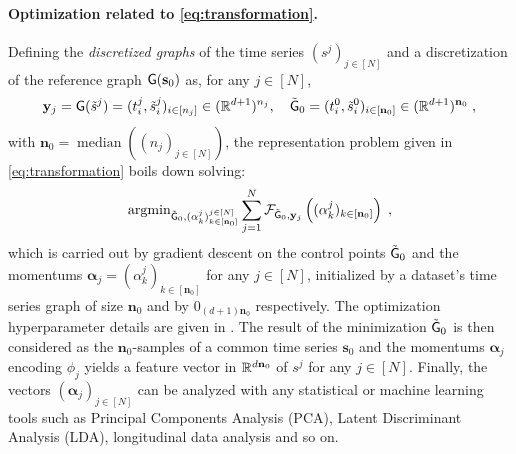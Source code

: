      \paragraph{Optimization related to \eqref{eq:transformation}.}
     Defining the \textit{discretized graphs} of the time series $(s^j)_{j\in[N]}$ and a discretization of the reference graph $\mathsf{G}(\mathbf{s}_0)$ as, for any $j\in[N]$,
 \begin{equation}
 \label{eq:descretized_graph}
 \mathbf{y}_j=\mathsf{G}(\tilde{s}^j)=(t_i^j,\tilde{s}^j_i)_{ i\in[n_j]}\in (\mathbb{R}^{d+1})^{n_j},\quad \tilde{\mathsf{G}}_0=(t_i^0,\tilde{s}^0_i)_{i\in[\mathbf{n}_0]}\in (\mathbb{R}^{d+1})^{\mathbf{n}_0} \; ,
 \end{equation}
 with $\mathbf{n}_0=\operatorname{median}((n_j)_{j\in[N]})$, the representation problem given in \eqref{eq:transformation} boils down solving:
 \begin{equation}
 \label{eq:general_optimization_problem}
 \operatorname{argmin}_{\tilde{\mathsf{G}}_0,(\alpha_k^j)_{k\in [\mathbf{n}_0]}^{j\in[N]}} \sum_{j=1}^N \mathcal{F}_{\tilde{\mathsf{G}}_0,\mathbf{y}_j}\left((\alpha_k^j)_{k\in [\mathbf{n}_0]}\right)\; ,
 \end{equation}
 which is carried out by gradient descent on the control points $\tilde{\mathsf{G}}_0$ and the momentums $\mathbf{\alpha}_j=(\alpha_k^j)_{k\in [\mathbf{n}_0]}$ for any $j\in[N]$, initialized by a dataset's time series graph of size $\mathbf{n}_0$ and by $0_{(d+1)\mathbf{n}_0}$ respectively.
 The optimization hyperparameter details are given in .
 The result of the minimization $\tilde{\mathsf{G}}_0$ is then considered as the $\mathbf{n}_0$-samples of a common time series $\mathbf{s}_0$ and the momentums $\mathbf{\alpha}_j$ encoding $\phi_j$ yields a feature vector in $\mathbb{R}^{d \mathbf{n}_0} $ of $s^j$ for any $j\in[N]$.
 Finally, the vectors $(\mathbf{\alpha}_j)_{j\in[N]}$ can be analyzed with any statistical or machine learning tools such as Principal Components Analysis (PCA), Latent Discriminant Analysis (LDA), longitudinal data analysis and so on.


